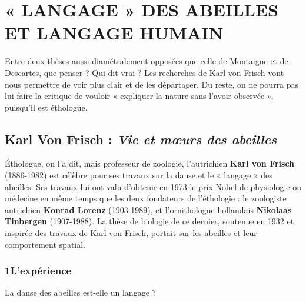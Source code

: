 \section{« LANGAGE » DES ABEILLES ET LANGAGE HUMAIN}
Entre deux thèses aussi diamétralement opposées que celle de Montaigne et de Descartes, que penser ? Qui dit vrai ? Les recherches de Karl von Frisch vont nous permettre de voir plus clair et de les départager. Du reste, on ne pourra pas lui faire la critique de vouloir « expliquer la nature sans l’avoir observée », puisqu’il est éthologue.
\subsection{Karl Von Frisch : \textit{Vie et mœurs des abeilles}}
Éthologue, on l’a dit, mais professeur de zoologie, l’autrichien \textbf{Karl von Frisch} (1886-1982) est célèbre pour ses travaux sur la danse et le « langage » des abeilles. Ses travaux lui ont valu d’obtenir en 1973 le prix Nobel de physiologie ou médecine en même temps que les deux fondateurs de l’éthologie : le zoologiste autrichien \textbf{Konrad Lorenz} (1903-1989), et l’ornithologue hollandais \textbf{Nikolaas Tinbergen} (1907-1988). La thèse de biologie de ce dernier, soutenue en 1932 et inspirée des travaux de Karl von Frisch, portait sur les abeilles et leur comportement spatial.
\subsubsection*{1\quad L’expérience}
La danse des abeilles est-elle un langage ?

